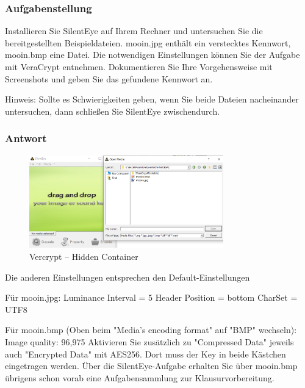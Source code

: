 \documentclass{article}
\begin{document}
\subsubsection*{Aufgabenstellung}

Installieren Sie SilentEye  auf Ihrem Rechner und untersuchen Sie die 
bereitgestellten Beispieldateien. mooin.jpg enthält ein verstecktes Kennwort, 
mooin.bmp eine Datei. Die notwendigen Einstellungen können Sie der Aufgabe mit 
VeraCrypt entnehmen. Dokumentieren Sie Ihre Vorgehensweise mit Screenshots und 
geben Sie das gefundene Kennwort an.

Hinweis: Sollte es Schwierigkeiten geben, wenn Sie beide Dateien nacheinander 
untersuchen, dann schließen Sie SilentEye zwischendurch.

\subsubsection*{Antwort}

\begin{figure}[H]
	\includegraphics[width=0.75\textwidth]{images/14}
	\centering
	\caption{Vercrypt – Hidden Container}
\end{figure}



Die anderen Einstellungen entsprechen den Default-Einstellungen

Für mooin.jpg: 
Luminance Interval = 5 
Header Position = bottom
CharSet = UTF8

Für mooin.bmp (Oben beim "Media's encoding format" auf "BMP" wechseln):
Image quality: 96,975%
Aktivieren Sie zusätzlich zu "Compressed Data" jeweils auch "Encrypted Data" mit AES256. Dort muss der Key in beide Kästchen eingetragen werden.
Über die SilentEye-Aufgabe erhalten Sie über mooin.bmp übrigens schon vorab eine Aufgabensammlung zur Klausurvorbereitung.
\end{document}
